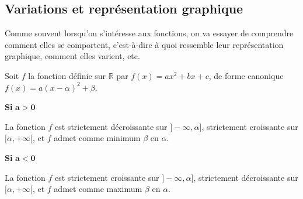 \documentclass[11pt]{article}
\begin{document}
\subsection{Variations et représentation graphique}

Comme souvent lorsqu'on s'intéresse aux fonctions, on va essayer de comprendre
comment elles se comportent, c'est-à-dire à quoi ressemble leur représentation
graphique, comment elles varient, etc.

\begin{prop}
  Soit $f$ la fonction définie sur $\mathbb{R}$ par $f(x)=ax^2+bx+c$, de forme
  canonique $f(x)=a(x-\alpha)^2+\beta$.

  \noindent
  \begin{minipage}[t]{.47\textwidth}
    \begin{center}
      {\bf Si} $\mathbf{a>0}$\vspace{.2cm}

    \end{center}
  La fonction $f$ est strictement décroissante sur $]-\infty, \alpha]$,
  strictement croissante sur $[\alpha, +\infty[$, et $f$ admet comme minimum
    $\beta$ en $\alpha$.
    \begin{center}
    \end{center}
  \end{minipage}
    \hfill
  \begin{minipage}[t]{.47\textwidth}
    \begin{center}
      {\bf Si} $\mathbf{a<0}$\vspace{.2cm}

    \end{center}
  La fonction $f$ est strictement croissante sur $]-\infty, \alpha]$,
  strictement décroissante sur $[\alpha, +\infty[$, et $f$ admet comme maximum
    $\beta$ en $\alpha$.
    \begin{center}
    \end{center}
  \end{minipage}
\end{prop}
\end{document}
